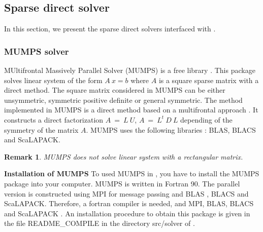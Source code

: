 \documentclass[a4paper,twoside,12pt]{book}
\newtheorem{remark}{Remark}
\begin{document}

\subsection{Sparse direct solver}

In this section, we present the sparse direct solvers interfaced with \freefempp .

\subsubsection{MUMPS solver}
\label{sectionmumps}

MUltifrontal Massively Parallel Solver (MUMPS) is a free library \cite{mumpspubl1,mumpspubl2,mumpspubl3}. This package solves linear system of the form $A \: x = b$ where
$A$ is a square sparse matrix with a direct method. The square matrix considered in MUMPS can be either unsymmetric, symmetric positive definite or general symmetric.
The method implemented in MUMPS is  a direct method based on a multifrontal approach \cite{mumpspubl1}. It constructs a direct factorization
$A \:= \: L\:U$, $A\: = \: L^t \: D \: L$ depending of the symmetry of the matrix $A$. MUMPS uses the following libraries : BLAS\cite{blas1,blas2}, BLACS and ScaLAPACK\cite{scalapackuserguide}.

\begin{remark} MUMPS does not solve linear system with a rectangular matrix.\\
\end{remark}

\begin{paragraph}
{\bf{Installation of MUMPS}}
To used MUMPS in \freefempp, you have to install the MUMPS package into your computer.
MUMPS is written in Fortran 90. The parallel version is constructed using MPI \cite{mpi} for message passing and BLAS \cite{blas1,blas2},
BLACS and ScaLAPACK\cite{scalapackuserguide}. Therefore, a fortran compiler is needed, and MPI, BLAS, BLACS and ScaLAPACK . An installation
procedure to obtain this package is given in the file README\_COMPILE in the directory src/solver of \freefempp.
\end{paragraph}
\end{document}
